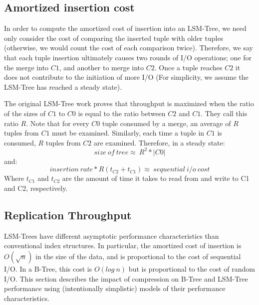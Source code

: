 \documentclass{vldb}
\newcommand{\rows}{Rose\xspace}
\begin{document}
\subsection{Amortized insertion cost}

In order to compute the amortized cost of insertion into an LSM-Tree,
we need only consider the cost of comparing the inserted tuple with
older tuples (otherwise, we would count the cost of each comparison
twice).  Therefore, we say that each tuple insertion ultimately causes
two rounds of I/O operations; one for the merge into $C1$, and another
to merge into $C2$.  Once a tuple reaches $C2$ it does not contribute
to the initiation of more I/O (For simplicity, we assume the LSM-Tree
has reached a steady state).

The original LSM-Tree work proves that throughput
is maximized when the ratio of the sizes of $C1$ to $C0$ is equal to
the ratio between $C2$ and $C1$.  They call this ratio $R$.  Note that
for every $C0$ tuple consumed by a
merge, an average of $R$ tuples from $C1$ must be examined.  Similarly, each time a
tuple in $C1$ is consumed, $R$ tuples from $C2$ are examined.
Therefore, in a steady state:
\[size~of~tree\approx~R^2*|C0|\]
and:
\[insertion~rate*R(t_{C2}+t_{C1})\approx~sequential~i/o~cost\]
Where $t_{C1}$ and $t_{C2}$ are the amount of time it takes to read
from and write to C1 and C2, respectively.


\subsection{Replication Throughput}

LSM-Trees have different asymptotic performance characteristics than
conventional index structures.  In particular, the amortized cost of
insertion is $O(\sqrt{n})$ in the size of the data, and is proportional
 to the cost of sequential I/O.  In a B-Tree, this cost is
$O(log~n)$ but is proportional to the cost of random I/O.
This section describes the impact of compression on B-Tree
and LSM-Tree performance using (intentionally simplistic) models of
their performance characteristics.
\end{document}
